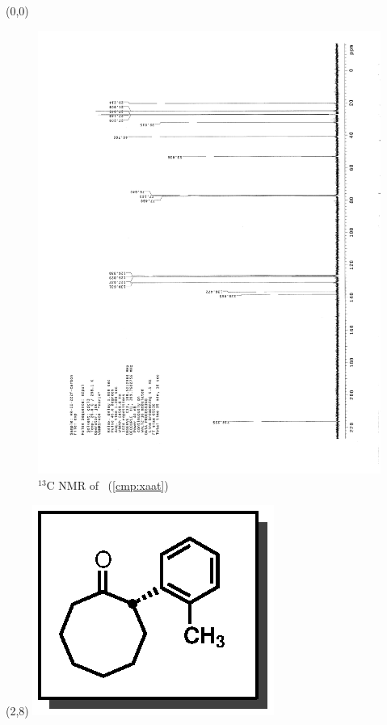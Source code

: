 \clearpage
\begin{textblock}{20}(0,0)
\begin{figure}[htb]
\caption{$^{13}$C NMR of  \CMPxaat\ (\ref{cmp:xaat})}
\includegraphics[scale=0.75, trim = 0mm 0mm 0mm 5mm,
clip]{chp_asymmetric/images/nmr/xaatC}
\vspace{-100pt}
\end{figure}
\end{textblock}
\begin{textblock}{1}(2,8)
\includegraphics[scale=0.8, angle=90]{chp_asymmetric/images/xaat}
\end{textblock}
\clearpage

